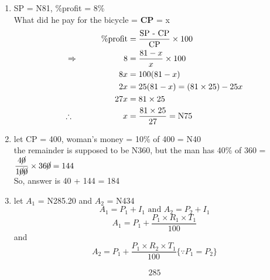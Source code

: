 \begin{multicols}{2}
\begin{enumerate}[label={\arabic*.}]
    \item SP = N81, \%profit = 8\% \\
    What did he pay for the bicycle = \textbf{CP} = x \\
    \begin{align*}
    \%\text{profit} &= \dfrac{ \text{SP - CP}}{\text{CP}} \times 100  \\ 
    \Rightarrow \hspace{55px} 8 &= \dfrac{81 - x }{x} \times 100 \\
     \hspace{50px} 8x &= 100(81 - x)  \\
     \hspace{50px} 2x &= 25(81 - x ) = (81\times25) -25x \\
     \hspace{50px} 27x &= 81\times 25 \\
    \therefore \hspace{60px}  x &= \dfrac{81 \times 25}{27} = \text{N}75
    \end{align*}

    \item let CP = 400, woman's money = 10\% of 400 = N40 \\
    the remainder is supposed to be N360, but the man has 40\% of 360 = \(\dfrac{4\cancel{0}}{1\cancel{0}\cancel{0}} \times 36\cancel{0} = 144 \) \vspace {5px}\\
    So, answer is 40 + 144 = 184

    \item let $A_1$ = N285.20 and $A_2$ = N434 \\
       \[ A_1 = P_1 + I_1 \text{ and } A_2 =  P_2 + I_1 \] 
    \[A_1= P_1 + \dfrac{P_1 \times R_1 \times T_1}{100} \]  and \\
    \[A_2 = P_1 + \dfrac{P_1 \times R_2 \times T_1}{100} \{\because P_1 = P_2\} \]

    \begin{align*} 
        285 
    \end{align*}


\end{enumerate}
\end{multicols}
